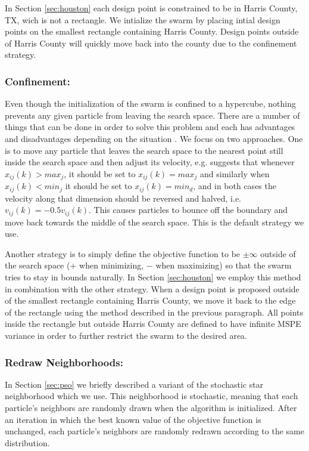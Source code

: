 \documentclass[cmbright]{staauth}
\begin{document}
In Section \ref{sec:houston} each design point is constrained to be in Harris County, TX, wich is not a rectangle. We intialize the swarm by placing intial design points on the smallest rectangle containing Harris County. Design points outside of Harris County will quickly move back into the county due to the confinement strategy.

\subsubsection{Confinement:}
Even though the initialization of the swarm is confined to a hypercube, nothing prevents any given particle from leaving the search space. There are a number of things that can be done in order to solve this problem and each has advantages and disadvantages depending on the situation \citep{helwig2007particle}. We focus on two approaches. One is to move any particle that leaves the search space to the nearest point still inside the search space and then adjust its velocity, e.g. \citet{clerc2011spso} suggests that whenever $x_{ij}(k) > max_j$, it should be set to $x_{ij}(k) = max_j$ and similarly when $x_{ij}(k) < min_j$ it should be set to $x_{ij}(k) = min_d$, and in both cases the velocity along that dimension should be reversed and halved, i.e. $v_{ij}(k) = -0.5 v_{ij}(k)$. This causes particles to bounce off the boundary and move back towards the middle of the search space. This is the default strategy we use.

Another strategy is to simply define the objective function to be $\pm\infty$ outside of the search space ($+$ when minimizing, $-$ when maximizing) so that the swarm tries to stay in bounds naturally. In Section \ref{sec:houston} we employ this method in combination with the other strategy. When a design point is proposed outside of the smallest rectangle containing Harris County, we move it back to the edge of the rectangle using the method described in the previous paragraph. All points inside the rectangle but outside Harris County are defined to have infinite MSPE variance in order to further restrict the swarm to the desired area.

\subsubsection{Redraw Neighborhoods:}
In Section \ref{sec:pso} we briefly described a variant of the stochastic star neighborhood which we use. This neighborhood is stochastic, meaning that each particle's neighbors are randomly drawn when the algorithm is initialized. After an iteration in which the best known value of the objective function is unchanged, each particle's neighbors are randomly redrawn according to the same distribution.
\end{document}
